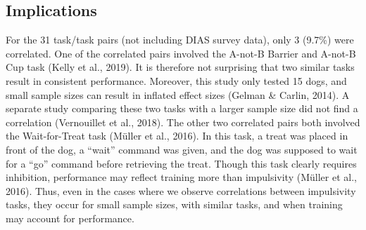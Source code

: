 \documentclass[
  ,pub,floatsintext]{apa6}
\begin{document}
\hypertarget{implications}{%
\subsection{Implications}\label{implications}}

For the 31 task/task pairs (not including DIAS survey data), only 3 (9.7\%) were correlated. One of the correlated pairs involved the A-not-B Barrier and A-not-B Cup task (Kelly et al., 2019). It is therefore not surprising that two similar tasks result in consistent performance. Moreover, this study only tested 15 dogs, and small sample sizes can result in inflated effect sizes (Gelman \& Carlin, 2014). A separate study comparing these two tasks with a larger sample size did not find a correlation (Vernouillet et al., 2018). The other two correlated pairs both involved the Wait-for-Treat task (Müller et al., 2016). In this task, a treat was placed in front of the dog, a ``wait'' command was given, and the dog was supposed to wait for a ``go'' command before retrieving the treat. Though this task clearly requires inhibition, performance may reflect training more than impulsivity (Müller et al., 2016). Thus, even in the cases where we observe correlations between impulsivity tasks, they occur for small sample sizes, with similar tasks, and when training may account for performance.
\end{document}
